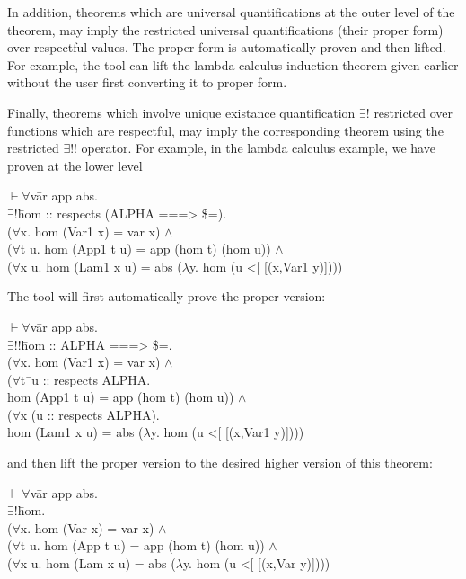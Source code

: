 \documentclass[envcountsame,runningheads]{llncs}
\begin{document}
In addition, theorems which are universal quantifications
at the outer level of the theorem, may
imply the restricted universal quantifications (their proper form)
over respectful values.
The proper form is automatically proven and then lifted.
For example, the tool can lift the
lambda calculus induction theorem given earlier without the user first
converting it to proper form.

Finally, theorems which involve unique existance
quantification $\exists$! restricted over functions which are respectful,
may imply the corresponding theorem using the
restricted $\exists$!!
operator.  For example, in the lambda
calculus example, we have proven
at the lower level
{\tt \begin{tabbing}
 $\vdash \forall$v\=ar app abs. \\
\>    $\exists !$\=hom :: respects (ALPHA ===> \$=). \\
\>\>    ($\forall$x. hom (Var1 x) = var x) $\wedge$ \\
\>\>    ($\forall$t u. hom (App1 t u) = app (hom t) (hom u)) $\wedge$ \\
\>\>    ($\forall$x u. hom (Lam1 x u) = abs ($\lambda$y. hom (u <[ [(x,Var1 y)])))
\end{tabbing}}

\noindent
The tool will first automatically prove the proper version:
{\tt \begin{tabbing}
 $\vdash \forall$v\=ar app abs. \\
\>    $\exists !!$\=hom :: ALPHA ===> \$=. \\
\>\>    ($\forall$x. hom (Var1 x) = var x) $\wedge$ \\
\>\>    ($\forall$t\=\ u :: respects ALPHA. \\
\>\>\>     hom (App1 t u) = app (hom t) (hom u)) $\wedge$ \\
\>\>    ($\forall$x (u :: respects ALPHA). \\
\>\>\>     hom (Lam1 x u) = abs ($\lambda$y. hom (u <[ [(x,Var1 y)])))
\end{tabbing}}

\noindent
and then lift the proper version to the desired higher version of this theorem:
{\tt \begin{tabbing}
 $\vdash \forall$v\=ar app abs. \\
\>    $\exists !$\=hom. \\
\>\>    ($\forall$x. hom (Var x) = var x) $\wedge$ \\
\>\>    ($\forall$t u. hom (App t u) = app (hom t) (hom u)) $\wedge$ \\
\>\>    ($\forall$x u. hom (Lam x u) = abs ($\lambda$y. hom (u <[ [(x,Var y)])))
\end{tabbing}}
\end{document}
